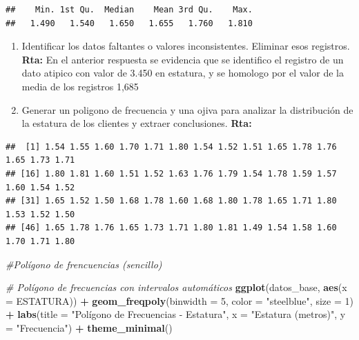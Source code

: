 \documentclass[
]{article}
\newenvironment{Shaded}{\begin{snugshade}}{\end{snugshade}}
\newcommand{\AttributeTok}[1]{\textcolor[rgb]{0.13,0.29,0.53}{#1}}
\newcommand{\CommentTok}[1]{\textcolor[rgb]{0.56,0.35,0.01}{\textit{#1}}}
\newcommand{\DecValTok}[1]{\textcolor[rgb]{0.00,0.00,0.81}{#1}}
\newcommand{\FunctionTok}[1]{\textcolor[rgb]{0.13,0.29,0.53}{\textbf{#1}}}
\newcommand{\NormalTok}[1]{#1}
\newcommand{\SpecialCharTok}[1]{\textcolor[rgb]{0.81,0.36,0.00}{\textbf{#1}}}
\newcommand{\StringTok}[1]{\textcolor[rgb]{0.31,0.60,0.02}{#1}}
\begin{document}
\begin{Shaded}
\end{Shaded}

\begin{verbatim}
##    Min. 1st Qu.  Median    Mean 3rd Qu.    Max. 
##   1.490   1.540   1.650   1.655   1.760   1.810
\end{verbatim}

\begin{enumerate}
\def\labelenumi{\alph{enumi}.}
\setcounter{enumi}{1}
\item
  Identificar los datos faltantes o valores inconsistentes. Eliminar
  esos registros. \textbf{Rta:} En el anterior respuesta se evidencia
  que se identifico el registro de un dato atipico con valor de 3.450 en
  estatura, y se homologo por el valor de la media de los registros
  1,685
\item
  Generar un poligono de frecuencia y una ojiva para analizar la
  distribución de la estatura de los clientes y extraer conclusiones.
  \textbf{Rta:}
\end{enumerate}

\begin{Shaded}
\end{Shaded}

\begin{verbatim}
##  [1] 1.54 1.55 1.60 1.70 1.71 1.80 1.54 1.52 1.51 1.65 1.78 1.76 1.65 1.73 1.71
## [16] 1.80 1.81 1.60 1.51 1.52 1.63 1.76 1.79 1.54 1.78 1.59 1.57 1.60 1.54 1.52
## [31] 1.65 1.52 1.50 1.68 1.78 1.60 1.68 1.80 1.78 1.65 1.71 1.80 1.53 1.52 1.50
## [46] 1.65 1.78 1.76 1.65 1.73 1.71 1.80 1.81 1.49 1.54 1.58 1.60 1.70 1.71 1.80
\end{verbatim}

\begin{Shaded}
\begin{Highlighting}[]
\CommentTok{\#Polígono de frencuencias (sencillo)}

\CommentTok{\# Polígono de frecuencias con intervalos automáticos}
\FunctionTok{ggplot}\NormalTok{(datos\_base, }\FunctionTok{aes}\NormalTok{(}\AttributeTok{x =}\NormalTok{ ESTATURA)) }\SpecialCharTok{+}
  \FunctionTok{geom\_freqpoly}\NormalTok{(}\AttributeTok{binwidth =} \DecValTok{5}\NormalTok{, }\AttributeTok{color =} \StringTok{"steelblue"}\NormalTok{, }\AttributeTok{size =} \DecValTok{1}\NormalTok{) }\SpecialCharTok{+}
  \FunctionTok{labs}\NormalTok{(}\AttributeTok{title =} \StringTok{"Polígono de Frecuencias {-} Estatura"}\NormalTok{,}
       \AttributeTok{x =} \StringTok{"Estatura (metros)"}\NormalTok{,}
       \AttributeTok{y =} \StringTok{"Frecuencia"}\NormalTok{) }\SpecialCharTok{+}
  \FunctionTok{theme\_minimal}\NormalTok{()}
\end{Highlighting}
\end{Shaded}
\end{document}
